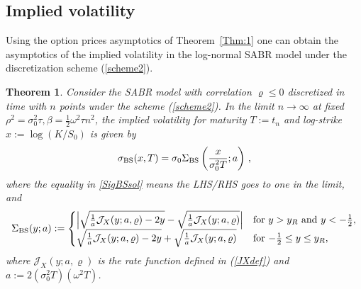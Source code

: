 \documentclass[11pt]{article}
\numberwithin{equation}{section}
\theoremstyle{plain}
\newtheorem{theorem}{Theorem}
\begin{document}
\subsection{Implied volatility}
\label{sec:4.2}


Using the option prices asymptotics of Theorem~\ref{Thm:1} one can obtain
the asymptotics of the implied volatility in the
log-normal SABR model under the discretization scheme (\ref{scheme2}).

\begin{theorem}\label{thm:main}
Consider the SABR model with correlation $\varrho \leq 0$ 
discretized in time with $n$ points under the scheme (\ref{scheme2}).
In the limit $n \to \infty$ at fixed $\rho^2 = \sigma_0^2 \tau,
\beta = \frac12 \omega^2 \tau n^2$, the implied volatility for 
maturity $T := t_n$ and log-strike $x := \log(K/S_0)$ is given by
\begin{equation}\label{SigBSsol}
\sigma_{\rm BS}(x,T ) = \sigma_0 
\Sigma_{\rm BS}\left( \frac{x}{\sigma_0^2 T};a \right)\,,
\end{equation}
where the equality in \eqref{SigBSsol} means the LHS/RHS goes to one in the 
limit, and
\begin{equation}\label{SigBSdef}
\Sigma_{\rm BS}(y;a) 
:= 
\begin{cases}
\left|\sqrt{\frac{1}{a} \mathcal{J}_X(y;a,\varrho) - 2y} - 
      \sqrt{\frac{1}{a} \mathcal{J}_X(y;a,\varrho)}\right|
&\text{for $y > y_R$ and $y<-\frac12$}, 
\\
\sqrt{\frac{1}{a} \mathcal{J}_X(y;a,\varrho) - 2y} + 
\sqrt{\frac{1}{a} \mathcal{J}_X(y;a,\varrho)}
&\text{for $-\frac12 \leq y \leq y_R$},
\end{cases}
\end{equation}
where $\mathcal{J}_X(y;a,\varrho)$ is the rate function defined in (\ref{JXdef}) 
and $a := 2(\sigma_0^2 T)(\omega^2 T)$. 
\end{theorem}
\end{document}
